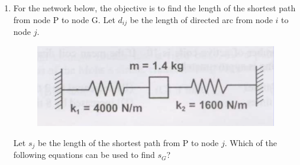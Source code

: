 \documentclass[journal,12pt,onecolumn]{IEEEtran}
\begin{document}
\begin{enumerate}[resume]
          \begin{enumerate}
          \end{enumerate}

    \item For the network below, the objective is to find the length of the shortest path from node P to node G. Let $d_{ij}$ be the length of directed arc from node $i$ to node $j$.

          \begin{figure}[H]
              \centering
              \includegraphics[scale=0.3]{q35}
              \caption{}
              \label{q35}
          \end{figure}
          Let $s_j$ be the length of the shortest path from P to node $j$. Which of the following equations can be used to find $s_G$?

          \begin{enumerate}
          \end{enumerate}


\end{enumerate}
\end{document}

